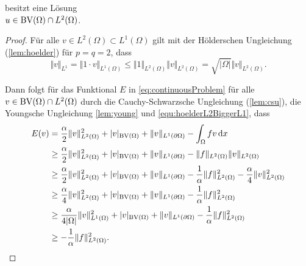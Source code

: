 \begin{theorem}
  \label{thm:contProblemExistence}
   besitzt eine Lösung \\$u\in\textup{BV}(\Omega)\cap
  L^2(\Omega)$.
\end{theorem}

\begin{proof}
  Für alle $v\in L^2(\Omega)\subset L^1(\Omega)$ gilt mit der Hölderschen
  Ungleichung
  (\cref{lem:hoelder}) für $p=q=2$, dass
  \begin{equation}\label{equ:hoelderL2BiggerL1}
    \Vert v\Vert_{L^1} 
    = \Vert 1\cdot v\Vert_{L^1(\Omega)}
    \leq \Vert 1\Vert_{L^2(\Omega)}\Vert v\Vert_{L^2(\Omega)}
    =\sqrt{|\Omega|} \Vert v\Vert_{L^2(\Omega)}.
  \end{equation}

  Dann folgt für das Funktional $E$ in \eqref{eq:continuousProblem}
  für alle $v\in \textup{BV}(\Omega)\cap L^2(\Omega)$ durch die
  Cauchy-Schwarzsche Ungleichung (\cref{lem:csu}), die Youngsche
  Ungleichung \eqref{lem:young} und \cref{equ:hoelderL2BiggerL1}, dass
  \begin{equation}
    \label{eq:contProbBddFromBelow}
    \begin{aligned}
      E(v)&=\frac{\alpha}{2}\Vert v\Vert_{L^2(\Omega)}^2 + |v|_{\textup{BV}(\Omega)}
      +\Vert v\Vert_{L^1(\partial\Omega)}-\int_\Omega fv\,\mathrm{d}x\\
      &\geq 
      \frac{\alpha}{2}\Vert v\Vert_{L^2(\Omega)}^2 + |v|_{\textup{BV}(\Omega)}
      +\Vert v\Vert_{L^1(\partial\Omega)}
      -\Vert f\Vert_{L^2(\Omega)}\Vert v\Vert_{L^2(\Omega)}\\
      &\geq 
      \frac{\alpha}{2}\Vert v\Vert_{L^2(\Omega)}^2 + |v|_{\textup{BV}(\Omega)}
      +\Vert v\Vert_{L^1(\partial\Omega)}
      -\frac{1}{\alpha}\Vert f\Vert_{L^2(\Omega)}^2
      -\frac{\alpha}{4}\Vert v\Vert_{L^2(\Omega)}^2\\
      &\geq 
      \frac{\alpha}{4}\Vert v\Vert_{L^2(\Omega)}^2 + |v|_{\textup{BV}(\Omega)}
      +\Vert v\Vert_{L^1(\partial\Omega)}-\frac{1}{\alpha}\Vert
      f\Vert_{L^2(\Omega)}^2\\
      &\geq 
      \frac{\alpha}{4|\Omega|}\Vert v\Vert_{L^1(\Omega)}^2 + |v|_{\textup{BV}(\Omega)}
      +\Vert v\Vert_{L^1(\partial\Omega)}-\frac{1}{\alpha}\Vert
      f\Vert_{L^2(\Omega)}^2\\
      &\geq -\frac{1}{\alpha}\Vert f\Vert_{L^2(\Omega)}^2.
    \end{aligned}
  \end{equation}


\end{proof}

